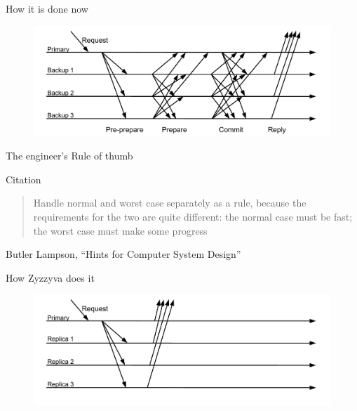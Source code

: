 \begin{frame}{How it is done now}
	
\begin{figure}
	\includegraphics[width=\textwidth]{messages4}
\end{figure}	
	
\end{frame}

\begin{frame}{The engineer's Rule of thumb}
	
\begin{block}{Citation}
\begin{quote}
Handle normal and worst case separately as a rule, because the requirements for the two are quite different:
the normal case must be fast; the worst case must make some progress
\end{quote}
Butler Lampson, “Hints for Computer System Design”
\end{block}

\end{frame}

\begin{frame}{How Zyzzyva does it}
	
\begin{figure}
	\includegraphics[width=\textwidth]{messages5}
\end{figure}	
	
\end{frame}

